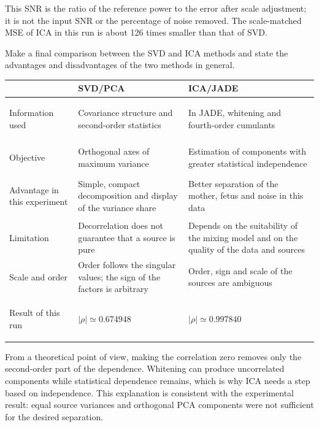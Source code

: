 This SNR is the ratio of the reference power to the error after scale adjustment; it is not the input SNR or the percentage of noise removed. The scale-matched MSE of ICA in this run is about 126 times smaller than that of SVD.


\begin{taskbox}
Make a final comparison between the SVD and ICA methods and state the advantages and disadvantages of the two methods in general.
\end{taskbox}

\begin{table}[H]
\centering
\renewcommand{\arraystretch}{1.3}
\begin{tabularx}{\textwidth}{@{}>{\bfseries\raggedright}p{3.1cm}XX@{}}
\toprule
\textnormal{} & \textbf{SVD/PCA} & \textbf{ICA/JADE}\\
\midrule
Information used & Covariance structure and second-order statistics & In JADE, whitening and fourth-order cumulants\\
Objective & Orthogonal axes of maximum variance & Estimation of components with greater statistical independence\\
Advantage in this experiment & Simple, compact decomposition and display of the variance share & Better separation of the mother, fetus and noise in this data\\
Limitation & Decorrelation does not guarantee that a source is pure & Depends on the suitability of the mixing model and on the quality of the data and sources\\
Scale and order & Order follows the singular values; the sign of the factors is arbitrary & Order, sign and scale of the sources are ambiguous\\
Result of this run & $|\rho|\simeq 0.674948$ & $|\rho|\simeq 0.997840$\\
\bottomrule
\end{tabularx}
\end{table}

From a theoretical point of view, making the correlation zero removes only the second-order part of the dependence. Whitening can produce uncorrelated components while statistical dependence remains, which is why ICA needs a step based on independence. This explanation is consistent with the experimental result: equal source variances and orthogonal PCA components were not sufficient for the desired separation.

